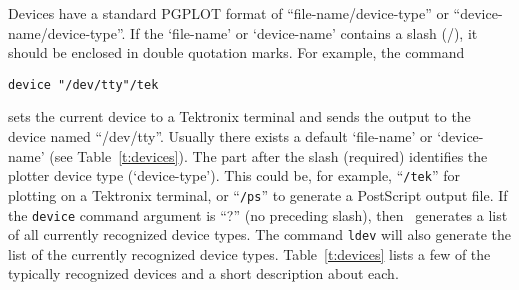 Devices have a standard PGPLOT format of
``file-name/device-type'' or ``device-name/device-type''.
If the `file-name' or `device-name' contains a slash (/), it should be
enclosed in double quotation marks.
For example, the command
\begin{wiplist}%
  \item {\tt device "/dev/tty"/tek}
\end{wiplist}
sets the current device to a Tektronix terminal and sends the output to
the device named ``/dev/tty''.
Usually there exists a default `file-name' or `device-name'
(see Table~\ref{t:devices}).
The part after the slash (required)
identifies the plotter device type (`device-type').
This could be,
for example, ``{\tt /tek}'' for plotting on a Tektronix terminal,
or ``{\tt /ps}'' to generate a PostScript output file.
If the {\tt device} command argument is ``?'' (no preceding slash),
then \wip\ generates a list of
all currently recognized device types.
The command
{\tt ldev}
will also
generate the list of the currently recognized device types.
Table~\ref{t:devices} lists a few of the typically recognized devices
and a short description about each.

